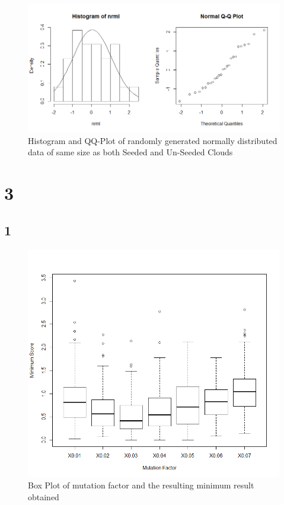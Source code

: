 \documentclass{article}
\begin{document}
    \begin{figure}[!htb]
      \includegraphics[scale=0.3]{../results/2_3_nrml.png}
      \caption{Histogram and QQ-Plot of randomly generated normally distributed data of same size as both Seeded and Un-Seeded Clouds}
      \label{fig:normal}
    \end{figure}
    
    \section{3}
    \subsection*{1}
    
    \begin{figure}[!htb]
    \centering
      \includegraphics[scale=0.3]{../results/3_1.png}
      \caption{Box Plot of mutation factor and the resulting minimum result obtained}
      \label{fig:box}
    \end{figure}
    
\end{document}
